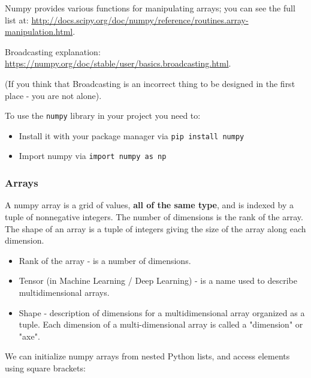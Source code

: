 \documentclass[
]{article}
\begin{document}
Numpy provides various functions for manipulating arrays; you can see
the full list at:
\url{http://docs.scipy.org/doc/numpy/reference/routines.array-manipulation.html}.

Broadcasting explanation:
\url{https://numpy.org/doc/stable/user/basics.broadcasting.html}.

(If you think that Broadcasting is an incorrect thing to be designed in
the first place - you are not alone).

To use the \texttt{numpy} library in your project you need to:

\begin{itemize}
\item
  Install it with your package manager via \texttt{pip\ install\ numpy}
\item
  Import numpy via \texttt{import\ numpy\ as\ np}
\end{itemize}

\hypertarget{arrays}{%
\subsubsection{Arrays}\label{arrays}}

A numpy array is a grid of values, \textbf{all of the same type}, and is
indexed by a tuple of nonnegative integers. The number of dimensions is
the rank of the array. The shape of an array is a tuple of integers
giving the size of the array along each dimension.

\begin{itemize}
\item
  Rank of the array - is a number of dimensions.
\item
  Tensor (in Machine Learning / Deep Learning) - is a name used to
  describe multidimensional arrays.
\item
  Shape - description of dimensions for a multidimensional array
  organized as a tuple. Each dimension of a multi-dimensional array is
  called a "dimension" or "axe".
\end{itemize}

We can initialize numpy arrays from nested Python lists, and access
elements using square brackets:
\end{document}
